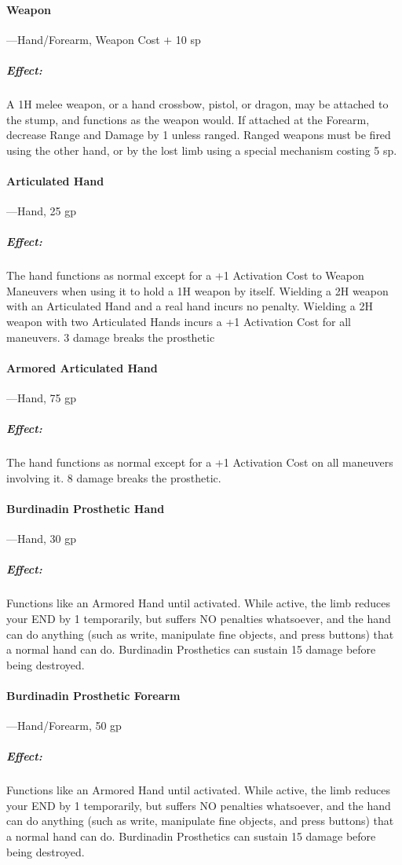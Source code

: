 \documentclass[oneside,11pt,english]{book}
\begin{document}
\paragraph{Weapon}---\quad Hand/Forearm, Weapon Cost $+$ 10 sp
\vspace{-15pt} \subparagraph{Effect:} A 1H melee weapon, or a hand crossbow,
pistol, or dragon, may be attached to the stump, and functions as the weapon
would. If attached at the Forearm, decrease Range and Damage by 1 unless ranged.
Ranged weapons must be fired using the other hand, or by the lost limb using a
special mechanism costing 5 sp. 
\paragraph{Articulated Hand}---\quad Hand, 25 gp
\vspace{-15pt} \subparagraph{Effect:} The hand functions as normal except for a
+1 Activation Cost to Weapon Maneuvers when using it to hold a 1H weapon by
itself. Wielding a 2H weapon with an Articulated Hand and a real hand incurs no
penalty. Wielding a 2H weapon with two Articulated Hands incurs a +1 Activation
Cost for all maneuvers. 3 damage breaks the prosthetic 
\paragraph{Armored Articulated Hand}---\quad Hand, 75 gp
\vspace{-15pt} \subparagraph{Effect:} The hand functions as normal except for a +1 Activation Cost on all maneuvers involving it. 8 damage breaks the prosthetic.
\paragraph{Burdinadin Prosthetic Hand}---\quad Hand, 30 gp
\vspace{-15pt} \subparagraph{Effect:} Functions like an Armored Hand until
activated. While active, the limb reduces your END by 1 temporarily, but suffers
NO penalties whatsoever, and the hand can do anything (such as write, manipulate
fine objects, and press buttons) that a normal hand can do. Burdinadin
Prosthetics can sustain 15 damage before being destroyed. 
\paragraph{Burdinadin Prosthetic Forearm}---\quad Hand/Forearm, 50 gp
\vspace{-15pt} \subparagraph{Effect:} Functions like an Armored Hand until
activated. While active, the limb reduces your END by 1 temporarily, but suffers
NO penalties whatsoever, and the hand can do anything (such as write, manipulate
fine objects, and press buttons) that a normal hand can do. Burdinadin
Prosthetics can sustain 15 damage before being destroyed. 
\end{document}
